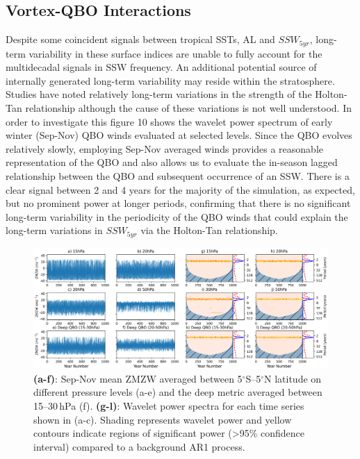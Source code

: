 \documentclass[wcd, manuscript]{copernicus}
\begin{document}


\subsection{Vortex-QBO Interactions}
Despite some coincident signals between tropical SSTs, AL and $SSW_{5yr}$, long-term variability in these surface indices are unable to fully account for the  multidecadal signals in SSW frequency. An additional potential source of internally generated long-term variability may reside within the stratosphere. Studies have noted relatively long-term variations in the strength of the Holton-Tan relationship \citep{Lu2008, Lu14, OspEA10} although the cause of these variations is not well understood. In order to investigate this figure 10 shows the wavelet power spectrum of early winter (Sep-Nov) QBO winds evaluated at selected levels. Since the QBO evolves relatively slowly, employing Sep-Nov averaged winds provides a reasonable representation of the QBO and also allows us to evaluate the in-season lagged relationship between the QBO and subsequent occurrence of an SSW. There is a clear signal between 2 and 4 years for the majority of the simulation, as expected, but no prominent power at longer periods,  confirming that there is no significant long-term variability in the periodicity of the QBO winds that could explain the long-term variations in $SSW_{5yr}$ via the Holton-Tan relationship.

\begin{center}
\begin{figure}[h!]
\noindent\includegraphics[width = \linewidth]{figures/QBO_levels.png}
\caption{\textbf{(a-f)}: Sep-Nov mean ZMZW averaged between 5$^\circ$S--5$^\circ$N latitude on different pressure levels (a-e) and the deep metric averaged between 15--30\,hPa (f). \textbf{(g-l)}: Wavelet power spectra for each time series shown in (a-c). Shading represents wavelet power and yellow contours indicate regions of significant power (>95\% confidence interval) compared to a background AR1 process.}
\label{fig4}
\end{figure}
\end{center}
\end{document}
